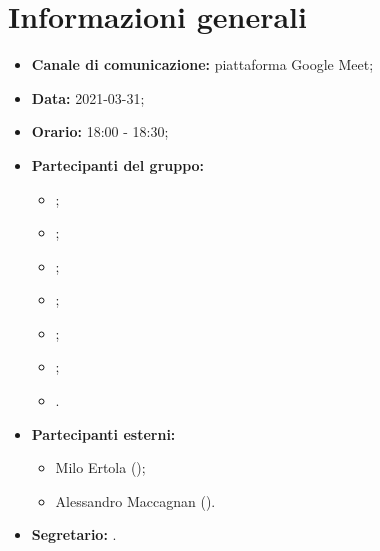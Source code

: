 \section{Informazioni generali}
\begin{itemize}
\item \textbf{Canale di comunicazione:} piattaforma Google Meet;
\item \textbf{Data:} 2021-03-31;
\item \textbf{Orario:} 18:00 - 18:30;
\item \textbf{Partecipanti del gruppo:}
	\begin{itemize}
	\item \MDI ;
	\item \MB ;
	\item \GB ;
	\item \VAS ;
	\item \FD ;
	\item \NM ;
	\item \SB .
	\end{itemize}
\item \textbf{Partecipanti esterni:}
	\begin{itemize}
	\item Milo Ertola (\Proponente);
	\item Alessandro Maccagnan (\Proponente).
	\end{itemize}
\item \textbf{Segretario:} \NM .

\end{itemize}